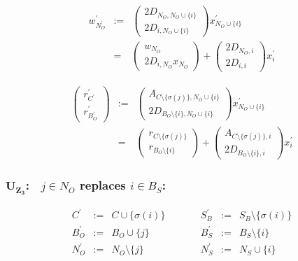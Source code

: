 \documentclass[a4paper]{article}
\begin{document}
\begin{eqnarray}
w_{N_{O}^{\prime}}^{\prime}
&:=&
\left(
\begin{array}{c}
2D_{N_{O}, N_{O} \cup \{i\}} \\
\hline
2D_{i, N_{O} \cup \{i\}}
\end{array}
\right)
x_{N_{O} \cup \{i\}}^{\prime}
\nonumber \\
&=&
\left(
\begin{array}{c}
w_{N_{O}} \\
\hline
2D_{i, N_{O}}x_{N_{O}}
\end{array}
\right)
+
\left(
\begin{array}{c}
2D_{N_{O}, i} \\
\hline
2D_{i,i}
\end{array}
\right)
x_{i}^{\prime}
\end{eqnarray}

\begin{eqnarray}
\left(
\begin{array}{c}
r_{C^{\prime}}^{\prime} \\
\hline
r_{B_{O}^{\prime}}^{\prime}
\end{array}
\right)
&:=&
\left(
\begin{array}{c}
A_{C \setminus \{\sigma(j)\}, N_{O} \cup \{i\}} \\
\hline
2D_{B_{O} \setminus \{i\}, N_{O} \cup \{i\}} 
\end{array}
\right)
x_{N_{O} \cup \{i\}}^{\prime} 
\nonumber \\
&=&
\left(
\begin{array}{c}
r_{C \setminus \{\sigma(j)\}} \\
\hline
r_{B_{O} \setminus \{i\}}
\end{array}
\right)
+
\left(
\begin{array}{c}
A_{C \setminus \{\sigma(j)\}, i} \\
\hline
2D_{B_{O} \setminus \{i\}, i}
\end{array}
\right)
x_{i}^{\prime}
\end{eqnarray}

\subsubsection{$\mathbf{U_{Z_{3}}}$:$\quad j \in N_{O}$ replaces $i \in B_{S}$:}
\begin{equation}
\label{update:o_z_rep_s}
\begin{array}{ccccccc}
C^{\prime}      &:=&  C \cup \{\sigma(i)\}
&\quad\quad&
S_{B}^{\prime}  &:=&  S_{B} \setminus  \{\sigma(i)\}   \\
B_{O}^{\prime}  &:=&  B_{O} \cup \{j\}
&\quad\quad&
B_{S}^{\prime}  &:=&  B_{S} \setminus \{i\} \\
N_{O}^{\prime}  &:=&  N_{O} \setminus \{j\}
&\quad\quad&
N_{S}^{\prime}  &:=&  N_{S} \cup \{i\}  
\end{array}
\end{equation}
\end{document}
